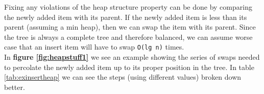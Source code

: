 



Fixing any violations of the heap structure property can be done by comparing the newly added item with its parent. If the newly added item is less than its parent (assuming a min heap), then we can swap the item with its parent. Since the tree is always a complete tree and therefore balanced, we can assume worse case that an insert item will have to swap \texttt{O(lg n)} times. \\

In \textbf{figure \ref{fig:heapstuff1}} we see an example showing the series of swaps needed to percolate the newly added item up to its proper position in the tree. In table \ref{tab:exinsertheap} we can see the steps (using different values) broken down better.

